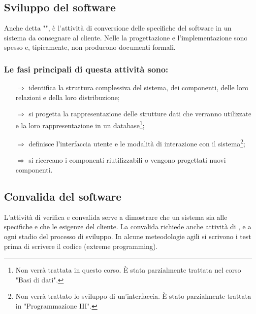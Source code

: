 \subsection{Sviluppo del software}

Anche detta "", è l'attività
di conversione delle specifiche del software in un sistema da consegnare al cliente.
Nelle  la progettazione e l'implementazione
sono spesso  e, tipicamente, non producono documenti formali. 

\subsubsection{Le fasi principali di questa attività sono:}

\begin{itemize}
    \item [$\Rightarrow$]  identifica la struttura
    complessiva del sistema, dei componenti, delle loro relazioni e della loro distribuzione; 
    \item [$\Rightarrow$]  si progetta la rappresentazione
    delle strutture dati che verranno utilizzate e la loro rappresentazione in un database\footnote{Non verrà trattata
    in questo corso. È stata parzialmente trattata nel corso "Basi di dati".}; 
    \item [$\Rightarrow$]  definisce l'interfaccia 
    utente e le modalità di interazione con il sistema\footnote{Non verrà trattato lo sviluppo di un'interfaccia. È stato parzialmente trattata
    in "Programmazione III".};
    \item [$\Rightarrow$]  si ricercano i componenti
    riutilizzabili o vengono progettati nuovi componenti.
\end{itemize}


\subsection{Convalida del software}

L'attività di verifica e convalida serve a dimostrare che un sistema sia 
 alle specifiche e che 
le esigenze del cliente.
La convalida richiede anche attività di ,  e 
a ogni stadio del processo di sviluppo. In alcune meteodologie agili
si scrivono i test prima di scrivere il codice (extreme programming).


